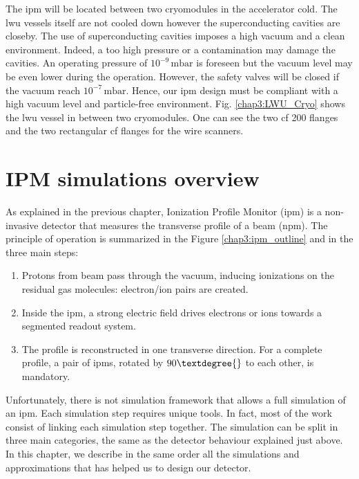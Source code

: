 \begin{refsection}
  The \acrshort{ipm} will be located between two cryomodules in the accelerator cold. The \acrshort{lwu} vessels itself are not cooled down however the superconducting cavities are closeby. The use of superconducting cavities imposes a high vacuum and a clean environment. Indeed, a too high pressure or a contamination may damage the cavities. An operating pressure of \(10^{-9}\,\mathrm{mbar}\) is foreseen but the vacuum level may be even lower during the operation. However, the safety valves will be closed if the vacuum reach \(10^{-7}\,\mathrm{mbar}\). Hence, our \acrshort{ipm} design must be compliant with a high vacuum level and particle-free environment. Fig. \ref{chap3:LWU_Cryo} shows the \acrshort{lwu} vessel in between two cryomodules. One can see the two \acrshort{cf} 200 flanges and the two rectangular \acrshort{cf} flanges for the wire scanners.

  \section{IPM simulations overview}

  

  As explained in the previous chapter, Ionization Profile Monitor (\acrshort{ipm}) is a non-invasive detector that measures the transverse profile of a beam (\acrshort{npm}).
  The principle of operation is summarized in the Figure \ref{chap3:ipm_outline} and in the three main steps:
  \begin{enumerate}
    \item Protons from beam pass through the vacuum, inducing ionizations on the residual gas molecules: electron/ion pairs are created.
    \item Inside the \acrshort{ipm}, a strong electric field drives electrons or ions towards a segmented readout system.
    \item The profile is reconstructed in one transverse direction. For a complete profile, a pair of \acrshort{ipm}s, rotated by $90\textdegree{}$ to each other, is mandatory.
  \end{enumerate}

  Unfortunately, there is not simulation framework that allows a full simulation of an \acrshort{ipm}. Each simulation step requires unique tools. In fact, most of the work consist of linking each simulation step together. The simulation can be split in three main categories, the same as the detector behaviour explained just above. In this chapter, we describe in the same order all the simulations and approximations that has helped us to design our detector.


\end{refsection}
